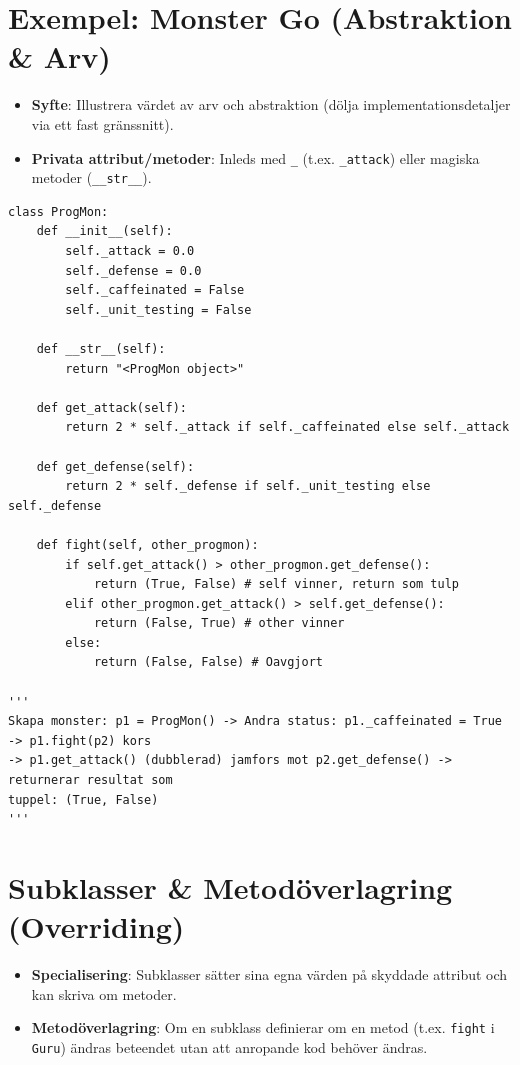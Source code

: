 \documentclass[10pt,a4paper]{report}
\begin{document}
\section{Exempel: Monster Go (Abstraktion \& Arv)}

\begin{itemize}[leftmargin=*]
  \item \textbf{Syfte}: Illustrera värdet av arv och abstraktion (dölja implementationsdetaljer via ett fast gränssnitt).
  \item \textbf{Privata attribut/metoder}: Inleds med \texttt{\_} (t.ex. \texttt{\_attack}) eller magiska metoder (\texttt{\_\_str\_\_}).
\end{itemize}

\begin{lstlisting}
class ProgMon:
    def __init__(self):
        self._attack = 0.0
        self._defense = 0.0
        self._caffeinated = False
        self._unit_testing = False

    def __str__(self):
        return "<ProgMon object>"

    def get_attack(self):
        return 2 * self._attack if self._caffeinated else self._attack

    def get_defense(self):
        return 2 * self._defense if self._unit_testing else self._defense

    def fight(self, other_progmon):
        if self.get_attack() > other_progmon.get_defense():
            return (True, False) # self vinner, return som tulp
        elif other_progmon.get_attack() > self.get_defense():
            return (False, True) # other vinner
        else:
            return (False, False) # Oavgjort

'''
Skapa monster: p1 = ProgMon() -> Andra status: p1._caffeinated = True -> p1.fight(p2) kors 
-> p1.get_attack() (dubblerad) jamfors mot p2.get_defense() -> returnerar resultat som 
tuppel: (True, False)
'''
\end{lstlisting}

\section{Subklasser \& Metodöverlagring (Overriding)}

\begin{itemize}[leftmargin=*]
  \item \textbf{Specialisering}: Subklasser sätter sina egna värden på skyddade attribut och kan skriva om metoder.
  \item \textbf{Metodöverlagring}: Om en subklass definierar om en metod (t.ex. \texttt{fight} i \texttt{Guru}) ändras beteendet utan att anropande kod behöver ändras.
\end{itemize}
\end{document}
